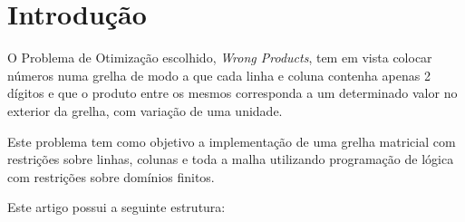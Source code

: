 \documentclass[11pt]{article}
\begin{document}
\bigskip
\bigskip

\section{Introdução}

O Problema de Otimização escolhido, \emph{Wrong Products}, tem em vista colocar números 
numa grelha de modo a que cada linha e coluna contenha apenas 2 dígitos e que o produto entre 
os mesmos corresponda a um determinado valor no exterior da grelha, com variação de uma unidade.

Este problema tem como objetivo a implementação de uma grelha matricial com restrições sobre 
linhas, colunas e toda a malha utilizando programação de lógica com restrições sobre domínios 
finitos.

\bigskip

Este artigo possui a seguinte estrutura:
\end{document}

